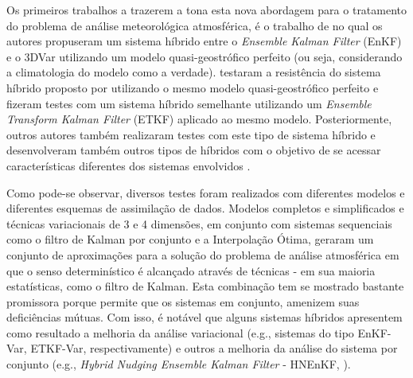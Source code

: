 Os primeiros trabalhos a trazerem a tona esta nova abordagem para o tratamento do problema de análise meteorológica atmosférica, é o trabalho de  no qual os autores propuseram um sistema híbrido entre o \textit{Ensemble Kalman Filter} (EnKF) e o 3DVar utilizando um modelo quasi-geostrófico perfeito (ou seja, considerando a climatologia do modelo como a verdade).  testaram a resistência do sistema híbrido proposto por  utilizando o mesmo modelo quasi-geostrófico perfeito e fizeram testes com um sistema híbrido semelhante utilizando um \textit{Ensemble Transform Kalman Filter} (ETKF) aplicado ao mesmo modelo. Posteriormente, outros autores também realizaram testes com este tipo de sistema híbrido \cite{wangetal/2008a,wangetal/2008b,elakkraouietodling/2013} e desenvolveram também outros tipos de híbridos com o objetivo de se acessar características diferentes dos sistemas envolvidos \cite{buehner/2005,zupanski/2005,wangetal/2007,zhangetal/2009,leietal/2012,claytonetal/2012,todlingeelakkraoui/2013}.

Como pode-se observar, diversos testes foram realizados com diferentes modelos e diferentes esquemas de assimilação de dados. Modelos completos e simplificados e técnicas variacionais de 3 e 4 dimensões, em conjunto com sistemas sequenciais como o filtro de Kalman por conjunto e a Interpolação Ótima, geraram um conjunto de aproximações para a solução do problema de análise atmosférica em que o senso determinístico é alcançado através de técnicas - em sua maioria estatísticas, como o filtro de Kalman. Esta combinação tem se mostrado bastante promissora porque permite que os sistemas em conjunto, amenizem suas deficiências mútuas. Com isso, é notável que alguns sistemas híbridos apresentem como resultado a melhoria da análise variacional (e.g., sistemas do tipo EnKF-Var, ETKF-Var,  respectivamente) e outros a melhoria da análise do sistema por conjunto (e.g., \textit{Hybrid Nudging Ensemble Kalman Filter} - HNEnKF, ). 

